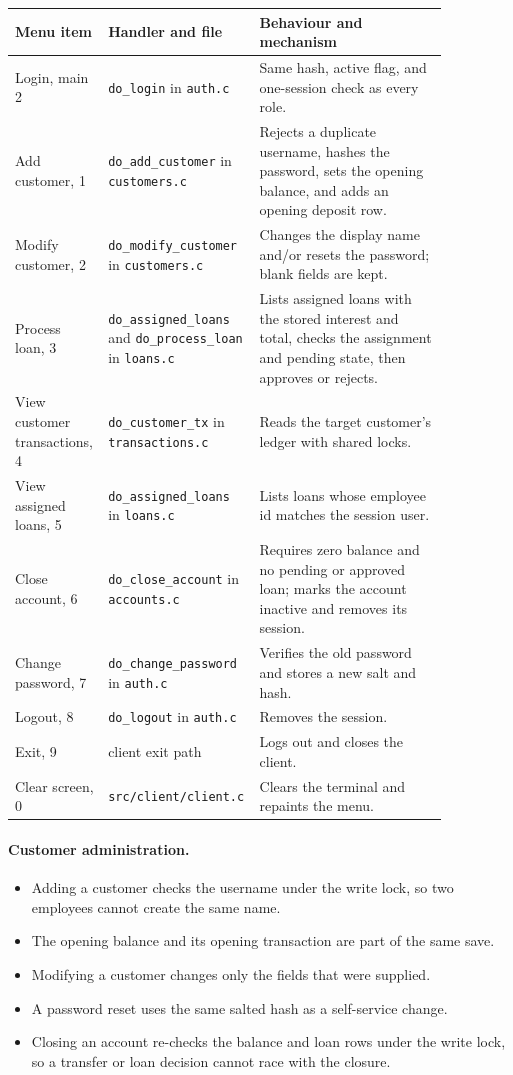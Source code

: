 \documentclass[11pt,a4paper]{article}
\begin{document}
\begin{longtable}{L{0.20\linewidth}L{0.23\linewidth}L{0.43\linewidth}}
\hline
Menu item & Handler and file & Behaviour and mechanism \\
\hline
\endhead
Login, main 2 & \texttt{do\_login} in \texttt{auth.c} & Same hash, active flag, and one-session check as every role. \\
Add customer, 1 & \texttt{do\_add\_customer} in \texttt{customers.c} & Rejects a duplicate username, hashes the password, sets the opening balance, and adds an opening deposit row. \\
Modify customer, 2 & \texttt{do\_modify\_customer} in \texttt{customers.c} & Changes the display name and/or resets the password; blank fields are kept. \\
Process loan, 3 & \texttt{do\_assigned\_loans} and \texttt{do\_process\_loan} in \texttt{loans.c} & Lists assigned loans with the stored interest and total, checks the assignment and pending state, then approves or rejects. \\
View customer transactions, 4 & \texttt{do\_customer\_tx} in \texttt{transactions.c} & Reads the target customer's ledger with shared locks. \\
View assigned loans, 5 & \texttt{do\_assigned\_loans} in \texttt{loans.c} & Lists loans whose employee id matches the session user. \\
Close account, 6 & \texttt{do\_close\_account} in \texttt{accounts.c} & Requires zero balance and no pending or approved loan; marks the account inactive and removes its session. \\
Change password, 7 & \texttt{do\_change\_password} in \texttt{auth.c} & Verifies the old password and stores a new salt and hash. \\
Logout, 8 & \texttt{do\_logout} in \texttt{auth.c} & Removes the session. \\
Exit, 9 & client exit path & Logs out and closes the client. \\
Clear screen, 0 & \texttt{src/client/client.c} & Clears the terminal and repaints the menu. \\
\hline
\end{longtable}

\paragraph{Customer administration.}
\begin{itemize}
\item Adding a customer checks the username under the write lock, so two employees cannot create the same name.
\item The opening balance and its opening transaction are part of the same save.
\item Modifying a customer changes only the fields that were supplied.
\item A password reset uses the same salted hash as a self-service change.
\item Closing an account re-checks the balance and loan rows under the write lock, so a transfer or loan decision cannot race with the closure.
\end{itemize}
\end{document}
